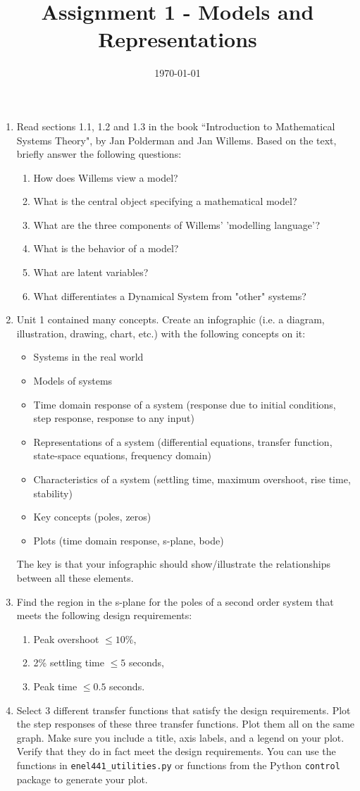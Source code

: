 \documentclass[12pt]{article}
\title{Assignment 1 - Models and Representations}
\date{\today}
\begin{document}
\maketitle

\begin{enumerate}
\item Read sections 1.1, 1.2 and 1.3 in the book ``Introduction to Mathematical Systems Theory", by Jan Polderman and Jan Willems. Based on the text, briefly answer the following questions:
\begin{enumerate}
    \item How does Willems view a model?
    \item What is the central object specifying a mathematical model?
    \item What are the three components of Willems' 'modelling language'?
    \item What is the behavior of a model?
    \item What are latent variables?
    \item What differentiates a Dynamical System from "other" systems?
\end{enumerate}
\item Unit 1 contained many concepts. Create an infographic (i.e. a diagram, illustration, drawing, chart, etc.) with the following concepts on it:
\begin{itemize}
\item Systems in the real world
\item Models of systems
\item Time domain response of a system (response due to initial conditions, step response, response to any input)
\item Representations of a system (differential equations, transfer function, state-space equations, frequency domain)
\item Characteristics of a system (settling time, maximum overshoot, rise time, stability)
\item Key concepts (poles, zeros)
\item Plots (time domain response, s-plane, bode)
\end{itemize}
The key is that your infographic should show/illustrate the relationships between all these elements. 
\item Find the region in the s-plane for the poles of a second order system that meets the following design requirements:
\begin{enumerate}
    \item Peak overshoot $\le 10$\%,
    \item 2\% settling time $\le 5$ seconds,
    \item Peak time $\le 0.5$ seconds. 
\end{enumerate}
\item Select $3$ different transfer functions that satisfy the design requirements. Plot the step responses of these three transfer functions. Plot them all on the same graph. Make sure you include a title, axis labels, and a legend on your plot. Verify that they do in fact meet the design requirements. You can use the functions in \texttt{enel441\_utilities.py} or functions from the Python \texttt{control} package to generate your plot.
\end{enumerate}
\end{document}
